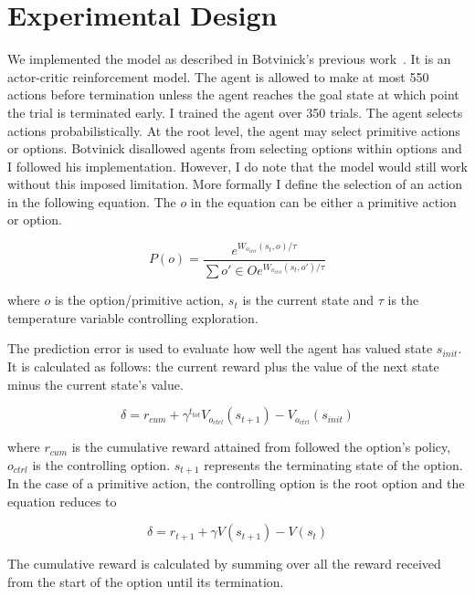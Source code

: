 \section{Experimental Design}
We implemented the model as described in Botvinick's previous work~\cite{botvinick2009hierarchically}. It is an actor-critic reinforcement model. The agent is allowed to make at most 550 actions before termination unless the agent reaches the goal state at which point the trial is terminated early. I trained the agent over 350 trials. The agent selects actions probabilistically. At the root level, the agent may select primitive actions or options. Botvinick disallowed agents from selecting options within options and I followed his implementation. However, I do note that the model would still work without this imposed limitation. More formally I define the selection of an action in the following equation. The $o$ in the equation can be either a primitive action or option.

\begin{equation}P(o) = \frac{ e^{W_{o_{ctrl}}(s_t,o)/\tau}}{\sum{o' \in O} e^{W_{o_{ctrl}}(s_t,o')/\tau}}\end{equation}

where $o$ is the option/primitive action, $s_{t}$ is the current state and $\tau$ is the temperature variable controlling exploration. 

The prediction error is used to evaluate how well the agent has valued state $s_{init}$. It is calculated as follows: the current reward plus the value of the next state minus the current state's value. 

\begin{equation}\delta = r_{cum} + \gamma^{t_{tot}}V_{o_{ctrl}}(s_{t+1}) - V_{o_{ctrl}}(s_{init})\end{equation}

where $r_{cum}$ is the cumulative reward attained from followed the option's policy, $o_{ctrl}$ is the controlling option. $s_{t+1}$ represents the terminating state of the option. In the case of a primitive action, the controlling option is the root option and the equation reduces to 

\begin{equation}\delta = r_{t+1} + \gamma V(s_{t+1}) - V(s_{t})\end{equation}

The cumulative reward is calculated by summing over all the reward received from the start of the option until its termination.

